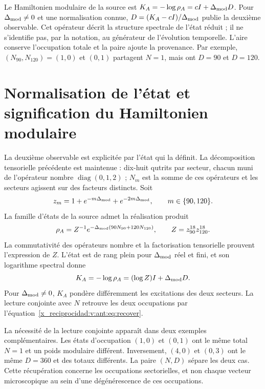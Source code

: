 Le Hamiltonien modulaire de la source est
$K_A=-\log\rho_A=cI+\Delta_{\rm mod}D$.
Pour $\Delta_{\rm mod}\ne0$ et une normalisation connue,
$D=(K_A-cI)/\Delta_{\rm mod}$ publie la deuxième observable.
Cet opérateur décrit la structure spectrale de l'état réduit ;
il ne s'identifie pas, par la notation, au générateur de l'évolution temporelle.
L'aire conserve l'occupation totale et la paire ajoute la provenance.
Par exemple, $(N_{90},N_{120})=(1,0)$ et $(0,1)$ partagent $N=1$,
mais ont $D=90$ et $D=120$.


\section{Normalisation de l'état et signification du Hamiltonien modulaire}
La deuxième observable est explicitée par l'état qui la définit.
La décomposition tensorielle précédente est maintenue : dix-huit qutrits
par secteur, chacun muni de l'opérateur nombre $\operatorname{diag}(0,1,2)$ ;
$N_m$ est la somme de ces opérateurs et les secteurs agissent sur des facteurs
distincts. Soit
\[
 z_m=1+e^{-m\Delta_{\rm mod}}+e^{-2m\Delta_{\rm mod}},
 \qquad m\in\{90,120\}.
\]
La famille d'états de la source admet la réalisation produit
\[
 \rho_A=Z^{-1}e^{-\Delta_{\rm mod}(90N_{90}+120N_{120})},
 \qquad Z=z_{90}^{18}z_{120}^{18}.
\]
La commutativité des opérateurs nombre et la factorisation tensorielle
prouvent l'expression de $Z$. L'état est de rang plein pour
$\Delta_{\rm mod}$ réel et fini, et son logarithme spectral donne
\[
 K_A=-\log\rho_A=(\log Z)I+\Delta_{\rm mod}D.
\]
Pour $\Delta_{\rm mod}\ne0$, $K_A$ pondère différemment les excitations
des deux secteurs. La lecture conjointe avec $N$ retrouve les deux occupations
par l'équation~\eqref{x_reciprocidad:v:ant:eq:recover}.

La nécessité de la lecture conjointe apparaît dans deux exemples complémentaires.
Les états d'occupation $(1,0)$ et $(0,1)$ ont le même total $N=1$
et un poids modulaire différent. Inversement, $(4,0)$ et $(0,3)$ ont
le même $D=360$ et des totaux différents. La paire $(N,D)$ sépare les deux
cas. Cette récupération concerne les occupations sectorielles, et non
chaque vecteur microscopique au sein d'une dégénérescence de ces occupations.

